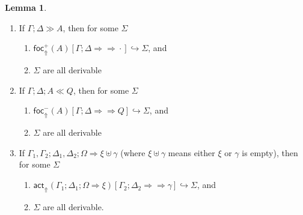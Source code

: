 \documentclass{article}
\theoremstyle{definition}
\newtheorem{lemma}{Lemma}
\newcommand{\bneuseqsymb}{
  \mathrel{\Longrightarrow\!\!\!\!\!\!\!\!\Longrightarrow}}
\newcommand{\bneuseq}[3]{#1 ; #2 \bneuseqsymb #3}
\newcommand{\brfrel}[1]{\textsf{foc}^+_{\Uparrow}(#1)}
\newcommand{\blfrel}[1]{\textsf{foc}^-_{\Uparrow}(#1)}
\newcommand{\bactrel}[1]{\textsf{act}_{\Uparrow}(#1)}
\newcommand{\relj}[3]{#1 [#2] \hookrightarrow #3}
\newcommand{\blfrelj}[3]{\relj{\blfrel{#1}}{#2}{#3}}
\newcommand{\bactrelj}[3]{\relj{\bactrel{#1}}{#2}{#3}}
\newcommand{\btriseq}[4]{#1; #2; #3 \Longrightarrow #4}
\newcommand{\rfocseq}[3]{#1; #2 \gg #3}
\newcommand{\lfocseq}[4]{#1; #2; #3 \ll #4}
\begin{document}
\begin{lemma}\label{completeness-lemma}
  \begin{enumerate}

  \item If $\rfocseq{\Gamma}{\Delta}{A}$, then for some $\Sigma$
    \begin{enumerate}
    \item $\relj{\brfrel{A}}{\bneuseq{\Gamma}{\Delta}{\cdot}}{\Sigma}$, and
    \item $\Sigma$ are all derivable
    \end{enumerate}

  \item If $\lfocseq{\Gamma}{\Delta}{A}{Q}$, then for some $\Sigma$
    \begin{enumerate}
    \item $\blfrelj{A}{\bneuseq{\Gamma}{\Delta}{Q}}{\Sigma}$, and
    \item $\Sigma$ are all derivable
    \end{enumerate}

  \item If $\btriseq{\Gamma_1, \Gamma_2}{\Delta_1, \Delta_2}{\Omega}{\xi \uplus
      \gamma}$ (where $\xi \uplus \gamma$ means either $\xi$ or $\gamma$ is
    empty), then for some $\Sigma$
    \begin{enumerate}
    \item
      $\bactrelj{\btriseq{\Gamma_1}{\Delta_1}{\Omega}{\xi}}{\bneuseq{\Gamma_2}{\Delta_2}{\gamma}}{\Sigma}$,
      and
    \item $\Sigma$ are all derivable.
    \end{enumerate}
  \end{enumerate}
\end{lemma}
\end{document}
